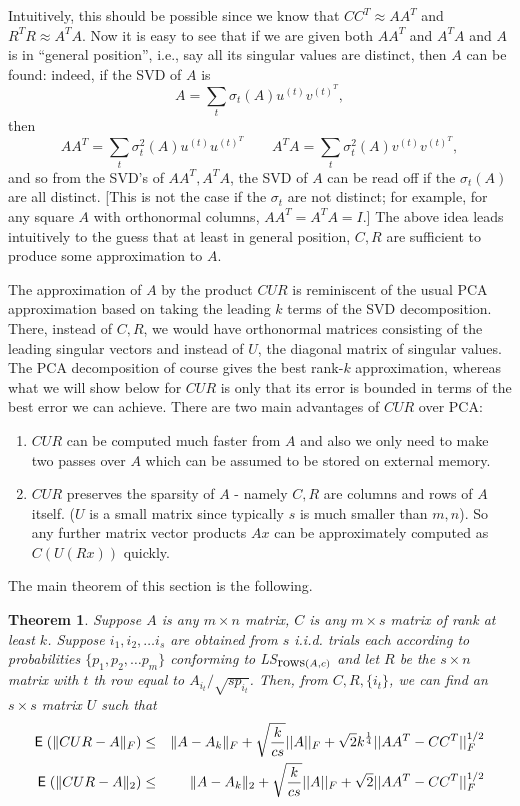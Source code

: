 \documentclass{book}
\newtheorem{theorem}{Theorem}[chapter]
\numberwithin{exercise}{chapter}
\begin{document}

Intuitively, this should be possible since we know that $CC^T \approx AA^T$ and
$R^TR \approx A^TA$.
Now it is easy to see that if we are given both $AA^T$ and $A^TA$ and $A$ is in ``general position'', i.e., say all its singular values are distinct, then $A$ can be found: indeed, if the SVD of $A$ is
$$A=\sum_t \sigma_t(A) u^{(t)}v^{(t)^T},$$
then
$$AA^T=\sum_t \sigma_t^2(A) u^{(t)}u^{(t)^T}\qquad A^TA=\sum_t\sigma_t^2(A) v^{(t)}v^{(t)^T},$$
and so from the SVD's of $AA^T,A^TA$, the SVD of $A$ can be read off if the $\sigma_t(A)$ are all distinct. [This is not the case if the $\sigma_t$ are not distinct; for example, for any square $A$ with orthonormal columns, $AA^T=A^TA=I$.]
The above idea leads intuitively to the guess that at least in general position, $C,R$ are sufficient to produce some approximation to  $A$.

The approximation of $A$ by the product $CUR$ is reminiscent of the usual PCA approximation based on taking the leading $k$ terms of the SVD decomposition. There, instead of $C,R$, we would have orthonormal matrices consisting of the leading singular vectors and instead of $U$, the diagonal matrix of singular values. The PCA decomposition of course gives the best rank-$k$ approximation, whereas what we will show below for $CUR$ is only that its error is bounded in terms of the best error we can achieve. There are two main advantages of $CUR$ over PCA:
\begin{enumerate}
 \item $CUR$ can be computed much faster from $A$ and also we only need to make two passes over $A$ which can be assumed to be stored on external memory.

 \item $CUR$ preserves the sparsity of $A$ - namely $C,R$ are columns and rows of $A$ itself. ($U$ is a small matrix since typically $s$ is much smaller than $m,n$). So any further matrix vector products $Ax$ can be approximately computed as $C(U(Rx))$ quickly.
\end{enumerate}

The main theorem of this section is the following.

\begin{theorem} Suppose $A$ is any $m\times n$ matrix, $C$ is any $m\times s$ matrix of rank at least $k$. Suppose $i_1,i_2,\ldots i_s$ are obtained from $s$ i.i.d. trials each according to probabilities $\{ p_1,p_2,\ldots p_m\}$ conforming to
LS$_{\hbox{rows}(A,c)}$ and let $R$ be the $s\times n$ matrix with $t$ th row equal to $A_{i_t}/\sqrt{sp_{i_t}}$.
Then, from $C,R, \{ i_t\}$, we can find an $s\times s$ matrix $U$ such that
\begin{eqnarray*}
\hbox{{\sf E}\;}(\|CUR-A\|_F)&\leq& \|A-A_k\|_F +\sqrt {k\over cs}||A||_F+\sqrt{2}k^{\frac{1}{4}}||AA^T-CC^T||_F^{1/2}\\
\hbox{{\sf E}\;}(\|CUR-A\|_2)&\leq& \|A-A_k\|_2 +\sqrt {k\over cs}||A||_F+\sqrt{2}||AA^T-CC^T||_F^{1/2}
\end{eqnarray*}
\end{theorem}
\end{document}
